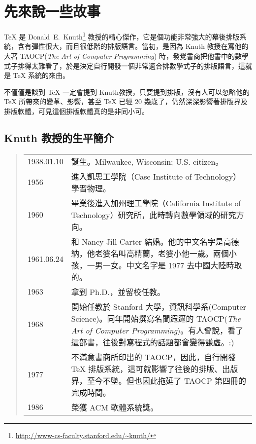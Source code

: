 
\chapter{先來說一些故事}

\TeX{} 是 Donald~E.~Knuth\footnote{\url{http://www-cs-faculty.stanford.edu/~knuth/}} 教授的精心傑作，它是個功能非常強大的幕後排版系統，含有彈性很大，而且很低階的排版語言。當初，是因為 Knuth 教授在寫他的大著 TAOCP(\textit{The Art of Computer Programming}) 時，發覺書商把他書中的數學式子排得太難看了，於是決定自行開發一個非常適合排數學式子的排版語言，這就是 \TeX{} 系統的來由。

不僅僅是談到 \TeX{} 一定會提到 Knuth教授，只要提到排版，沒有人可以忽略他的 \TeX{} 所帶來的變革、影響，甚至 \TeX{} 已經 20 幾歲了，仍然深深影響著排版界及排版軟體，可見這個排版軟體真的是非同小可。

\section{Knuth 教授的生平簡介}

\begin{quote}
\begin{tabular}{lp{}}
1938.01.10  & 誕生。Milwaukee, Wisconsin; U.S. citizen。\\
1956        & 進入凱思工學院（Case Institute of Technology）學習物理。\\
1960        & 畢業後進入加州理工學院（California Institute of Technology）研究所，此時轉向數學領域的研究方向。\\
1961.06.24  & 和 Nancy Jill Carter 結婚。他的中文名字是高德納\index{高德納}，他老婆名叫高精蘭\index{高精蘭}，老婆小他一歲。兩個小孩，一男一女。中文名字是 1977 去中國大陸時取的。\\
1963        & 拿到 Ph.D.，並留校任教。\\
1968        & 開始任教於 Stanford 大學，資訊科學系(Computer Science)。同年開始撰寫名聞遐邇的 TAOCP({\em The Art of Computer Programming})。有人曾說，看了這部書，往後對寫程式的話題都會變得謙虛。:)\\
1977        & 不滿意書商所印出的 TAOCP，因此，自行開發 \TeX{} 排版系統，這可就影響了往後的排版、出版界，至今不墜。但也因此拖延了 TAOCP 第四冊的完成時間。\\
1986        & 榮獲 ACM 軟體系統獎。
\end{tabular}
\end{quote}

